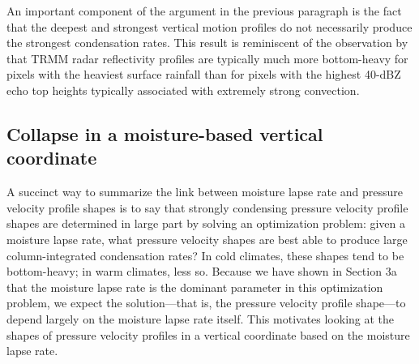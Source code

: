 \documentclass[twocol]{ametsoc}
\begin{document}
An important component of the argument in the previous paragraph is the fact that the deepest and strongest vertical motion profiles do not necessarily produce the strongest condensation rates. This result is reminiscent of the observation by \citet{Hamada2015WeakStorms} that TRMM radar reflectivity profiles are typically much more bottom-heavy for pixels with the heaviest surface rainfall than for pixels with the highest 40-dBZ echo top heights typically associated with extremely strong convection.

\subsection{Collapse in a moisture-based vertical coordinate}

A succinct way to summarize the link between moisture lapse rate and pressure velocity profile shapes is to say that strongly condensing pressure velocity profile shapes are determined in large part by solving an optimization problem: given a moisture lapse rate, what pressure velocity shapes are best able to produce large column-integrated condensation rates? In cold climates, these shapes tend to be bottom-heavy; in warm climates, less so. Because we have shown in Section 3a that the moisture lapse rate is the dominant parameter in this optimization problem, we expect the solution---that is, the pressure velocity profile shape---to depend largely on the moisture lapse rate itself. This motivates looking at the shapes of pressure velocity profiles in a vertical coordinate based on the moisture lapse rate.
\end{document}
